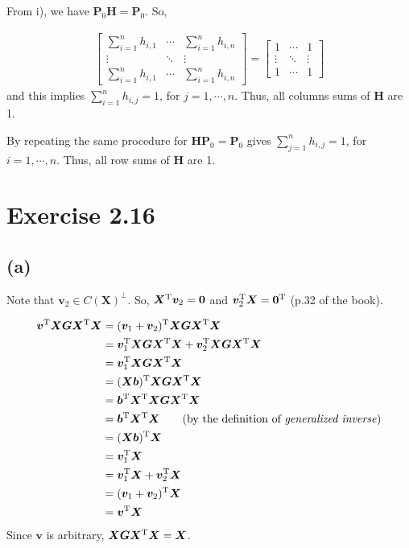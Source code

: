 \documentclass[a4paper]{article}
\begin{document}
From i), we have $\bm{P}_{0}\bm{H} = \bm{P}_{0}$. So,

\begin{align*}
\begin{bmatrix}
\sum_{i=1}^{n} h_{i,1} & \cdots & \sum_{i=1}^{n} h_{i,n}\\
\vdots & \ddots & \vdots\\
\sum_{i=1}^{n} h_{i,1} & \cdots & \sum_{i=1}^{n} h_{i,n}
\end{bmatrix}
=
\begin{bmatrix}
1 & \cdots & 1\\
\vdots & \ddots & \vdots\\
1 & \cdots & 1
\end{bmatrix}
\end{align*}
and this implies $\sum_{i=1}^{n} h_{i,j} = 1$, for $j = 1, \cdots, n$.
Thus, all columns sums of $\bm{H}$ are 1.

By repeating the same procedure for $\bm{H}\bm{P}_{0} = \bm{P}_{0}$ gives
$\sum_{j=1}^{n} h_{i,j} = 1$, for $i = 1, \cdots, n$. Thus, all row sums of $\bm{H}$ are 1.

\vspace{\baselineskip}
\section{Exercise 2.16}
\subsection{(a)}
Note that $\bm{v}_{2} \in C(\bm{X})^{\perp}$. So, $\bm{X}^{\rm T}\bm{v}_{2} = \bm{0}$ and $\bm{v}_{2}^{\rm T}\bm{X} = \bm{0}^{\rm T}$ (p.32 of the book).

\begin{align*}
\bm{v}^{\rm T}\bm{X}\bm{G}\bm{X}^{\rm T}\bm{X}
&= (\bm{v}_{1} + \bm{v}_{2})^{\rm T}\bm{X}\bm{G}\bm{X}^{\rm T}\bm{X}\\
&= \bm{v}_{1}^{\rm T}\bm{X}\bm{G}\bm{X}^{\rm T}\bm{X} + \bm{v}_{2}^{\rm T}\bm{X}\bm{G}\bm{X}^{\rm T}\bm{X}\\
&= \bm{v}_{1}^{\rm T}\bm{X}\bm{G}\bm{X}^{\rm T}\bm{X}\\
&= (\bm{X}\bm{b})^{\rm T}\bm{X}\bm{G}\bm{X}^{\rm T}\bm{X}\\
&= \bm{b}^{\rm T}\bm{X}^{\rm T}\bm{X}\bm{G}\bm{X}^{\rm T}\bm{X}\\
&= \bm{b}^{\rm T}\bm{X}^{\rm T}\bm{X}\tag{by the definition of \textit{generalized inverse}}\\
&= (\bm{X}\bm{b})^{\rm T}\bm{X}\\
&= \bm{v}_{1}^{\rm T}\bm{X}\\
&= \bm{v}_{1}^{\rm T}\bm{X} + \bm{v}_{2}^{\rm T}\bm{X}\\
&= (\bm{v}_{1} + \bm{v}_{2})^{\rm T}\bm{X}\\
&= \bm{v}^{\rm T}\bm{X}
\end{align*}
Since $\bm{v}$ is arbitrary, $\bm{X}\bm{G}\bm{X}^{\rm T}\bm{X} = \bm{X}$.
\end{document}
